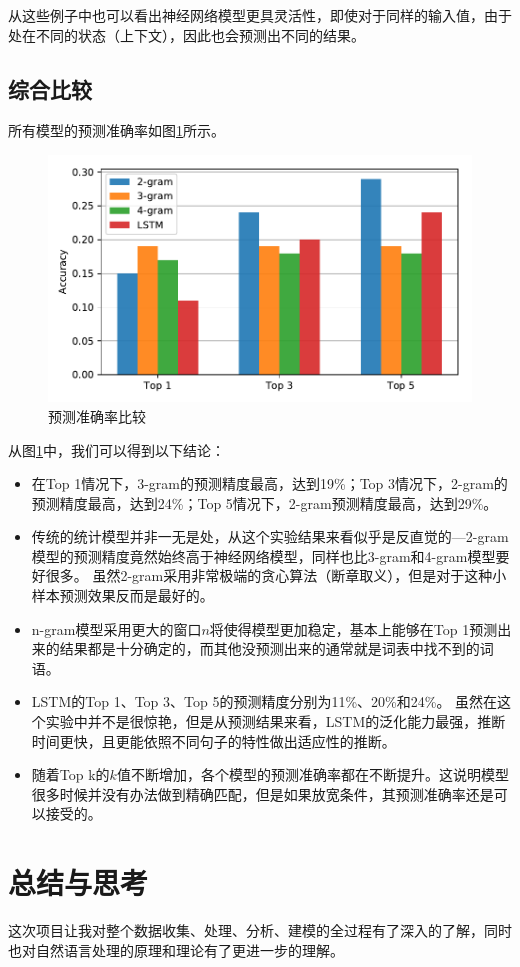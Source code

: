 \documentclass[logo,reportComp]{thesis}
\begin{document}
从这些例子中也可以看出神经网络模型更具灵活性，即使对于同样的输入值，由于处在不同的状态（上下文），因此也会预测出不同的结果。

\subsection{综合比较}
所有模型的预测准确率如图\ref{fig:accuracy}所示。
\begin{figure}[H]
\centering
\includegraphics[width=0.8\linewidth]{fig/accuracy.pdf}
\caption{预测准确率比较}
\label{fig:accuracy}
\end{figure}

从图\ref{fig:accuracy}中，我们可以得到以下结论：
\begin{itemize}
\item 在Top 1情况下，3-gram的预测精度最高，达到19\%；Top 3情况下，2-gram的预测精度最高，达到24\%；Top 5情况下，2-gram预测精度最高，达到29\%。
\item 传统的统计模型并非一无是处，从这个实验结果来看似乎是反直觉的---2-gram模型的预测精度竟然始终高于神经网络模型，同样也比3-gram和4-gram模型要好很多。
虽然2-gram采用非常极端的贪心算法（断章取义），但是对于这种小样本预测效果反而是最好的。
\item n-gram模型采用更大的窗口$n$将使得模型更加稳定，基本上能够在Top 1预测出来的结果都是十分确定的，而其他没预测出来的通常就是词表中找不到的词语。
\item LSTM的Top 1、Top 3、Top 5的预测精度分别为11\%、20\%和24\%。
虽然在这个实验中并不是很惊艳，但是从预测结果来看，LSTM的泛化能力最强，推断时间更快，且更能依照不同句子的特性做出适应性的推断。
\item 随着Top k的$k$值不断增加，各个模型的预测准确率都在不断提升。这说明模型很多时候并没有办法做到精确匹配，但是如果放宽条件，其预测准确率还是可以接受的。
\end{itemize}

\section{总结与思考}
这次项目让我对整个数据收集、处理、分析、建模的全过程有了深入的了解，同时也对自然语言处理的原理和理论有了更进一步的理解。
\end{document}
